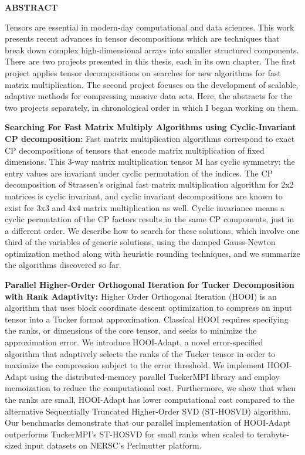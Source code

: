 \documentclass[MS]{wfuthesis}
\begin{document}
    \begin{center}
        \textbf{ABSTRACT}
    \end{center}
    Tensors are essential in modern-day computational and data sciences. This
    work presents recent advances in tensor decompositions which are techniques
    that break down complex high-dimensional arrays into smaller structured
    components. There are two projects presented in this thesis, each in its own
    chapter. The first project applies tensor decompositions on searches for new
    algorithms for fast matrix multiplication. The second project focuses on the
    development of scalable, adaptive methods for compressing massive data sets.
    Here, the abstracts for the two projects separately, in chronological order
    in which I began working on them.

    \textbf{Searching For Fast Matrix Multiply Algorithms using Cyclic-Invariant
    CP decomposition:} Fast matrix multiplication algorithms correspond to exact
    CP decompositions of tensors that encode matrix multiplication of fixed
    dimensions. This 3-way matrix multiplication tensor M has cyclic symmetry:
    the entry values are invariant under cyclic permutation of the indices. The
    CP decomposition of Strassen's original fast matrix multiplication algorithm
    for 2x2 matrices is cyclic invariant, and cyclic invariant decompositions
    are known to exist for 3x3 and 4x4 matrix multiplication as well. Cyclic
    invariance means a cyclic permutation of the CP factors results in the same
    CP components, just in a different order. We describe how to search for
    these solutions, which involve one third of the variables of generic
    solutions, using the damped Gauss-Newton optimization method along with
    heuristic rounding techniques, and we summarize the algorithms discovered so
    far.

    \textbf{Parallel Higher-Order Orthogonal Iteration for Tucker Decomposition
    with Rank Adaptivity:} Higher Order Orthogonal Iteration (HOOI) is an
    algorithm that uses block coordinate descent optimization to compress an
    input tensor into a Tucker format approximation. Classical HOOI requires
    specifying the ranks, or dimensions of the core tensor, and seeks to
    minimize the approximation error. 	We introduce HOOI-Adapt, a novel
    error-specified algorithm that adaptively selects the ranks of the Tucker
    tensor in order to maximize the compression subject to the error threshold.
    We implement HOOI-Adapt using the distributed-memory parallel TuckerMPI
    library and employ memoization to reduce the computational cost.
    Furthermore, we show that when the ranks are small, HOOI-Adapt has lower
    computational cost compared to the alternative Sequentially Truncated
    Higher-Order SVD (ST-HOSVD) algorithm. Our benchmarks demonstrate that our
    parallel implementation of HOOI-Adapt outperforms TuckerMPI's ST-HOSVD for
    small ranks when scaled to terabyte-sized input datasets on NERSC's
    Perlmutter platform.
\end{document}
